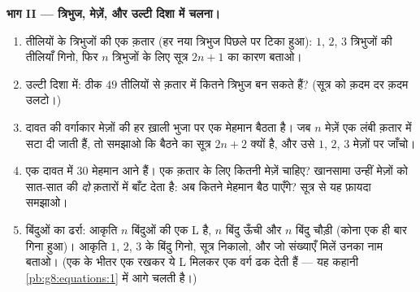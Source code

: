 \begin{problem}
\medskip
\noindent\textbf{भाग II --- त्रिभुज, मेज़ें, और उल्टी दिशा में
चलना।}
\begin{enumerate}[resume]
  \item तीलियों के त्रिभुजों की एक क़तार (हर नया त्रिभुज पिछले पर
        टिका हुआ): $1$, $2$, $3$ त्रिभुजों की तीलियाँ गिनो, फिर
        $n$ त्रिभुजों के लिए सूत्र $2n + 1$ का कारण बताओ।
  \item उल्टी दिशा में: ठीक $49$ तीलियों से क़तार में कितने
        त्रिभुज बन सकते हैं? (सूत्र को क़दम दर क़दम उलटो।)
  \item दावत की वर्गाकार मेज़ों की हर ख़ाली भुजा पर एक मेहमान
        बैठता है। जब $n$ मेज़ें एक लंबी क़तार में सटा दी जाती
        हैं, तो समझाओ कि बैठने का सूत्र $2n + 2$ क्यों है, और उसे
        $1$, $2$, $3$ मेज़ों पर जाँचो।
  \item एक दावत में $30$ मेहमान आने हैं। एक क़तार के लिए कितनी
        मेज़ें चाहिए? खानसामा उन्हीं मेज़ों को सात-सात की
        \emph{दो} क़तारों में बाँट देता है: अब कितने मेहमान बैठ
        पाएँगे? सूत्र से यह फ़ायदा समझाओ।
  \item बिंदुओं का ढर्रा: आकृति $n$ बिंदुओं की एक L है, $n$
        बिंदु ऊँची और $n$ बिंदु चौड़ी (कोना एक ही बार गिना हुआ)।
        आकृति $1$, $2$, $3$ के बिंदु गिनो, सूत्र निकालो, और जो
        संख्याएँ मिलें उनका नाम बताओ। (एक के भीतर एक रखकर ये L
        मिलकर एक वर्ग ढक देती हैं --- यह कहानी
        \cref{pb:g8:equations:1} में आगे चलती है।)
\end{enumerate}


\end{problem}
